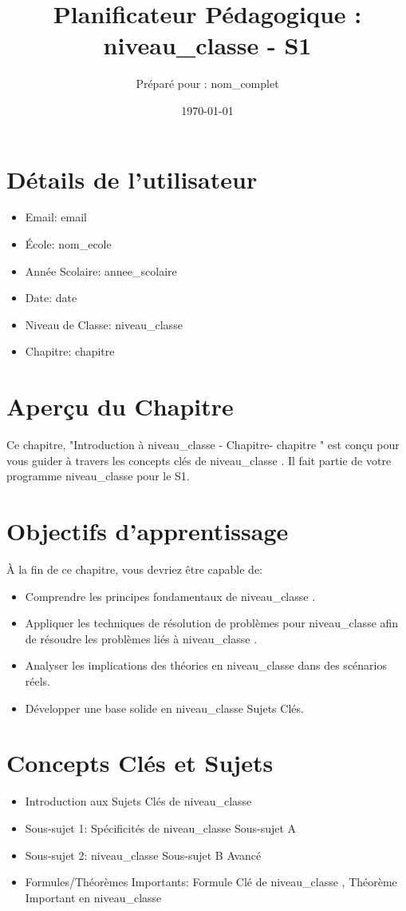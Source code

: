 \documentclass{article}
\title{Planificateur Pédagogique : {{ niveau_classe }} - S1}
\author{Préparé pour : {{ nom_complet }}}
\date{\today}
\begin{document}
\maketitle

\section*{Détails de l'utilisateur}
\begin{itemize}
    \item Email: {{ email }}
    \item École: {{ nom_ecole }}
    \item Année Scolaire: {{ annee_scolaire }}
    \item Date: {{ date }}
    \item Niveau de Classe: {{ niveau_classe }}
    \item Chapitre: {{ chapitre }}
\end{itemize}

\section*{Aperçu du Chapitre}
Ce chapitre, "Introduction à {{ niveau_classe }} - Chapitre-{{ chapitre }}" est conçu pour vous guider à travers les concepts clés de {{ niveau_classe }}. Il fait partie de votre programme {{ niveau_classe }} pour le S1.

\section*{Objectifs d'apprentissage}
À la fin de ce chapitre, vous devriez être capable de:
\begin{itemize}
    \item Comprendre les principes fondamentaux de {{ niveau_classe }}.
    \item Appliquer les techniques de résolution de problèmes pour {{ niveau_classe }} afin de résoudre les problèmes liés à {{ niveau_classe }}.
    \item Analyser les implications des théories en {{ niveau_classe }} dans des scénarios réels.
    \item Développer une base solide en {{ niveau_classe }} Sujets Clés.
\end{itemize}

\section*{Concepts Clés et Sujets}
\begin{itemize}
    \item Introduction aux Sujets Clés de {{ niveau_classe }}
    \item Sous-sujet 1: Spécificités de {{ niveau_classe }} Sous-sujet A
    \item Sous-sujet 2: {{ niveau_classe }} Sous-sujet B Avancé
    \item Formules/Théorèmes Importants: Formule Clé de {{ niveau_classe }}, Théorème Important en {{ niveau_classe }}
\end{itemize}
\end{document}
